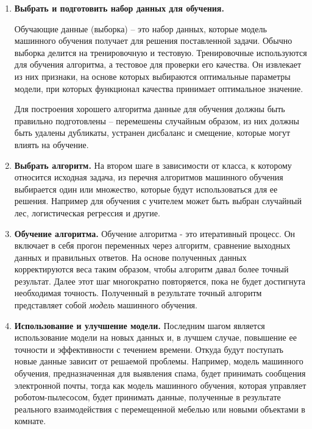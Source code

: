\begin{enumerate}
	\item \textbf{Выбрать и подготовить набор данных для обучения.} 
	
	Обучающие данные (выборка) -- это набор данных, которые модель машинного обучения получает для решения поставленной задачи. Обычно выборка делится на тренировочную и тестовую. Тренировочные используются для обучения алгоритма, а тестовое для проверки его качества. Он извлекает из них признаки, на основе которых выбираются оптимальные параметры модели, при которых функционал качества принимает оптимальное значение.
	
	Для построения хорошего алгоритма данные для обучения должны быть правильно подготовлены -- перемешены случайным образом, из них должны быть удалены дубликаты,  устранен дисбаланс и смещение, которые могут влиять на обучение. 
	
	\item \textbf{Выбрать алгоритм.}
	На втором шаге в зависимости от класса, к которому относится исходная задача, из перечня алгоритмов машинного обучения выбирается один или множество, которые будут использоваться для ее решения. Например для обучения с учителем может быть выбран случайный лес, логистическая регрессия и другие.
	
	\item \textbf{Обучение алгоритма.}
	Обучение алгоритма - это итеративный процесс. Он включает в себя прогон переменных через алгоритм, сравнение выходных данных и правильных ответов. На основе полученных данных корректируются веса таким образом, чтобы алгоритм давал более точный результат. Далее этот шаг многократно повторяется, пока не будет достигнута необходимая точность. Полученный в результате точный алгоритм представляет собой {\it модель} машинного обучения.
	
	\item \textbf{Использование и улучшение модели.}
	Последним шагом является использование модели на новых данных и, в лучшем случае, повышение ее точности и эффективности с течением времени. Откуда будут поступать новые данные зависит от решаемой проблемы. Например, модель машинного обучения, предназначенная для выявления спама, будет принимать сообщения электронной почты, тогда как модель машинного обучения, которая управляет роботом-пылесосом, будет принимать данные, полученные в результате реального взаимодействия с перемещенной мебелью или новыми объектами в комнате. 
	
	
\end{enumerate}

